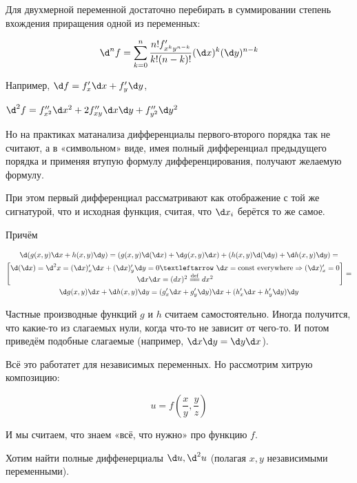 \documentclass[12pt, a4paper]{article}
\begin{document}
Для двухмерной переменной достаточно перебирать в суммировании степень вхождения приращения одной из переменных:

\begin{equation}
  \d^n  f = \sum_{k = 0}^{n} 
  \frac{n! f'_{x^k y^{n - k}} } {k! (n - k)!} (\d x)^k (\d y)^{n - k}
\end{equation}

Например, $\d f = f'_x \d x + f'_y \d y$, 

$\d^2 f = f''_{x^2} \d x^2 + 2 f''_{xy} \d x \d y + f''_{y^2} \d y^2$

Но на практиках матанализа дифференциалы первого-второго порядка так не считают, а 
в «символьном» виде, имея полный дифференциал предыдущего порядка и применяя втупую формулу дифференцирования, получают желаемую формулу.

При этом первый дифференциал рассматривают как отображение с той же сигнатурой, что и исходная функция,
считая, что $\d x_i$ берётся то же самое.

Причём 

\begin{multline}
  \d(g(x, y)\d x + h(x, y)\d y) = (g(x, y) \d(\d x) + \d g(x, y) \d x) + (h(x, y) \d(\d y) + \d h(x, y) \d y) = \\
  \begin{bmatrix}
    \d(\d x) = \d^2 x = (\d x)'_x \d x + (\d x)'_y \d y = 0 ← \d x = \mathrm{const\ everywhere} \Rightarrow (\d x)'_x = 0 \\
    \d x \d x = (dx)^2 \eqdef dx^2
  \end{bmatrix} = \\
  \d g(x, y) \d x + \d h(x, y) \d y = (g'_x \d x + g'_y \d y) \d x + (h'_x \d x + h'_y \d y) \d y
\end{multline}

Частные производные функций $g$ и $h$ считаем самостоятельно.
Иногда получится, что какие-то из слагаемых нули, когда что-то не зависит от чего-то.
И потом приведём подобные слагаемые (например, $\d x \d y = \d y \d x$).

Всё это работатет для независимых переменных. 
Но рассмотрим хитрую композицию:

\begin{equation}
  u = f(\frac{x}{y}, \frac{y}{z})
\end{equation}

И мы считаем, что знаем «всё, что нужно» про функцию $f$.

Хотим найти полные диффенерциалы $\d u, \d^2 u$ (полагая $x, y$ независимыми переменными).
\end{document}

